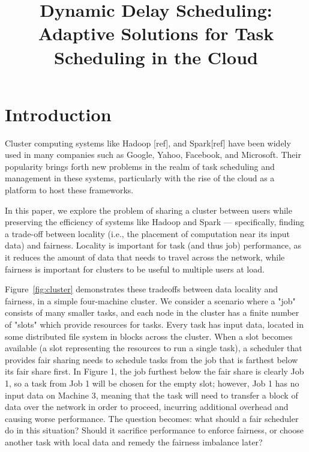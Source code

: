 \documentclass[10pt,conference,compsocconf,letterpaper]{IEEEtran}
\begin{document}


\title{Dynamic Delay Scheduling: Adaptive Solutions for Task Scheduling in the Cloud}

\date{}
\maketitle



\begin{abstract}
%

\end{abstract}

\section{Introduction}\label{sec:intro}
Cluster computing systems like Hadoop [ref], and Spark[ref] have been widely 
used in many companies such as Google, Yahoo, Facebook, and Microsoft. Their popularity 
brings forth new problems in the realm of task scheduling and management in these systems,
particularly with the rise of the cloud as a platform to host these frameworks.

In this paper, we explore the problem of sharing a cluster between users while preserving 
the efficiency of systems like Hadoop and Spark --- specifically, finding a trade-off 
between locality (i.e., the placement of computation near its input data) and fairness. 
Locality is important for task (and thus job) performance, as it reduces the amount of data 
that needs to travel across the network, while fairness is important for clusters to be 
useful to multiple users at load. 

Figure~\ref{fig:cluster}  demonstrates these tradeoffs between data locality and fairness,
in a simple four-machine cluster. We consider a
scenario where a "job" consists of many smaller tasks, and each node in the cluster 
has a finite number of "slots" which provide resources for tasks. Every task has input data,
located in some distributed file system in blocks across the cluster. When a slot
becomes available (a slot representing the resources to run a single task),
a scheduler that provides fair sharing needs to schedule tasks from the job 
that is farthest below its fair share first. In Figure 1, the job furthest below
the fair share is clearly Job 1, so a task from Job 1 will be chosen for the empty slot; however,
Job 1 has no input data on Machine 3, meaning that the task will need to transfer a block
of data over the network in order to proceed, incurring additional overhead and causing
worse performance. The question becomes: what should a fair scheduler do
in this situation? Should it sacrifice performance to enforce fairness, or choose another task
with local data and remedy the fairness imbalance later? 
\end{document}
